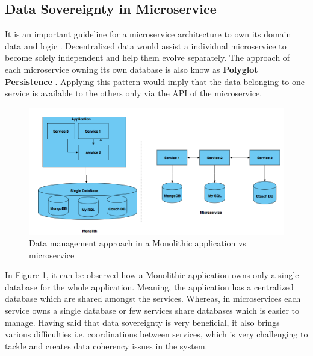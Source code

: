     \newpage
    \subsection{Data Sovereignty in Microservice}
    \label{subsection:dataSovereignty}
    It is an important guideline for a microservice architecture to own its domain data and 
    logic \cite[p.~29]{Torre2017}. Decentralized data would assist a individual microservice
    to become solely independent and help them evolve separately. The approach of each microservice owning its own database is also
    know as \textbf{Polyglot Persistence} \cite{Polyglot}. Applying this pattern would imply that the
    data belonging to one service is available to the others only via the API of the microservice.

    \begin{figure}[H]
        \centering \includegraphics[scale=0.4]{grafiken/polyglot.png}
        \caption{Data management approach in a Monolithic application vs microservice \cite{FowlerMartin}}
        \label{fig:polyglot}
    \end{figure}
    
   In Figure \ref{fig:polyglot}, it can be observed how a Monolithic application owns only a single database for the whole application. Meaning,
   the application has a centralized database which are shared amongst the services. Whereas, in microservices each service owns
   a single database or few services share databases which is easier to manage. Having said that data sovereignty is very beneficial, it also brings various difficulties
   i.e. coordinations between services, which is very challenging to tackle and creates data coherency issues in the system. 





